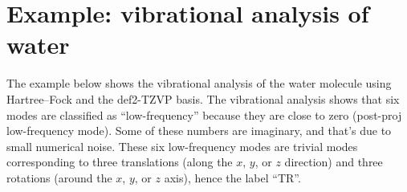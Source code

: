\documentclass[../Main/notes.tex]{subfiles}
\begin{document}
\section{Example: vibrational analysis of water}


The example below shows the vibrational analysis of the water molecule using Hartree--Fock and the def2-TZVP basis.
The vibrational analysis shows that six modes are classified as ``low-frequency'' because they are close to zero (post-proj low-frequency mode).
Some of these numbers are imaginary, and that's due to small numerical noise.
These six low-frequency modes are trivial modes corresponding to three translations (along the $x$, $y$, or $z$ direction) and three rotations (around the $x$, $y$, or $z$ axis), hence the label ``TR''.
\end{document}
